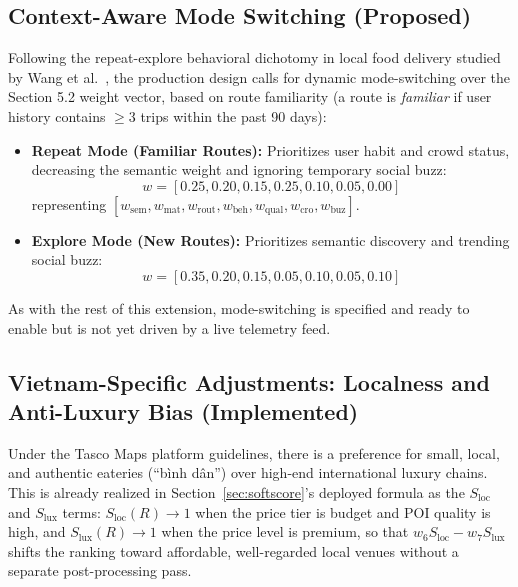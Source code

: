 \documentclass[acmsmall,screen]{acmart}
\begin{document}
\subsection{Context-Aware Mode Switching (Proposed)}
Following the repeat-explore behavioral dichotomy in local food delivery studied by Wang et al.~\cite{wang2024righttool}, the production design calls for dynamic mode-switching over the Section 5.2 weight vector, based on route familiarity (a route is \textit{familiar} if user history contains $\geq 3$ trips within the past 90 days):
\begin{itemize}
    \item \textbf{Repeat Mode (Familiar Routes):} Prioritizes user habit and crowd status, decreasing the semantic weight and ignoring temporary social buzz:
    \begin{equation*}
    w = [0.25, 0.20, 0.15, 0.25, 0.10, 0.05, 0.00]
    \end{equation*}
    representing $[w_{\text{sem}}, w_{\text{mat}}, w_{\text{rout}}, w_{\text{beh}}, w_{\text{qual}}, w_{\text{cro}}, w_{\text{buz}}]$.
    \item \textbf{Explore Mode (New Routes):} Prioritizes semantic discovery and trending social buzz:
    \begin{equation*}
    w = [0.35, 0.20, 0.15, 0.05, 0.10, 0.05, 0.10]
    \end{equation*}
\end{itemize}
As with the rest of this extension, mode-switching is specified and ready to enable but is not yet driven by a live telemetry feed.

\subsection{Vietnam-Specific Adjustments: Localness and Anti-Luxury Bias (Implemented)}
Under the Tasco Maps platform guidelines, there is a preference for small, local, and authentic eateries (``bình dân'') over high-end international luxury chains. This is already realized in Section~\ref{sec:softscore}'s deployed formula as the $S_{\text{loc}}$ and $S_{\text{lux}}$ terms: $S_{\text{loc}}(R) \to 1$ when the price tier is budget and POI quality is high, and $S_{\text{lux}}(R) \to 1$ when the price level is premium, so that $w_6 S_{\text{loc}} - w_7 S_{\text{lux}}$ shifts the ranking toward affordable, well-regarded local venues without a separate post-processing pass.
\end{document}
